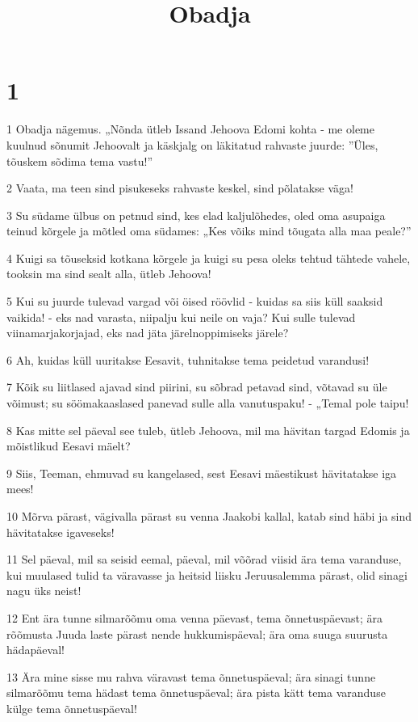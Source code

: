 

\title{Obadja}

\chapter{1}

\par 1 Obadja nägemus. „Nõnda ütleb Issand Jehoova Edomi kohta - me oleme kuulnud sõnumit Jehoovalt ja käskjalg on läkitatud rahvaste juurde: ”Üles, tõuskem sõdima tema vastu!”
\par 2 Vaata, ma teen sind pisukeseks rahvaste keskel, sind põlatakse väga!
\par 3 Su südame ülbus on petnud sind, kes elad kaljulõhedes, oled oma asupaiga teinud kõrgele ja mõtled oma südames: „Kes võiks mind tõugata alla maa peale?”
\par 4 Kuigi sa tõuseksid kotkana kõrgele ja kuigi su pesa oleks tehtud tähtede vahele, tooksin ma sind sealt alla, ütleb Jehoova!
\par 5 Kui su juurde tulevad vargad või öised röövlid - kuidas sa siis küll saaksid vaikida! - eks nad varasta, niipalju kui neile on vaja? Kui sulle tulevad viinamarjakorjajad, eks nad jäta järelnoppimiseks järele?
\par 6 Ah, kuidas küll uuritakse Eesavit, tuhnitakse tema peidetud varandusi!
\par 7 Kõik su liitlased ajavad sind piirini, su sõbrad petavad sind, võtavad su üle võimust; su söömakaaslased panevad sulle alla vanutuspaku! - „Temal pole taipu!
\par 8 Kas mitte sel päeval see tuleb, ütleb Jehoova, mil ma hävitan targad Edomis ja mõistlikud Eesavi mäelt?
\par 9 Siis, Teeman, ehmuvad su kangelased, sest Eesavi mäestikust hävitatakse iga mees!
\par 10 Mõrva pärast, vägivalla pärast su venna Jaakobi kallal, katab sind häbi ja sind hävitatakse igaveseks!
\par 11 Sel päeval, mil sa seisid eemal, päeval, mil võõrad viisid ära tema varanduse, kui muulased tulid ta väravasse ja heitsid liisku Jeruusalemma pärast, olid sinagi nagu üks neist!
\par 12 Ent ära tunne silmarõõmu oma venna päevast, tema õnnetuspäevast; ära rõõmusta Juuda laste pärast nende hukkumispäeval; ära oma suuga suurusta hädapäeval!
\par 13 Ära mine sisse mu rahva väravast tema õnnetuspäeval; ära sinagi tunne silmarõõmu tema hädast tema õnnetuspäeval; ära pista kätt tema varanduse külge tema õnnetuspäeval!
